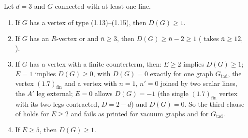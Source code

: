 
\begin{lemma}\label{sup2:lem:S7cor}
Let $d=3$ and $G$ connected with at least one line.
\begin{enumerate}[label=\textup{(\alph*)},nosep,leftmargin=*]
\item If $G$ has a vertex of type (1.13)--(1.15), then $D(G)\ge1$.
\item If $G$ has an $R$-vertex \cite[(1.9)]{Ba3} or \cite[(1.11)]{Ba3} and $\bar n\ge3$, then $D(G)\ge\bar n-2\ge1$ (\cite{Ba3} takes $\bar n\ge12$, \cite[p.~421]{Ba3}).
\item If $G$ has a vertex \cite[(1.7)]{Ba3} with a finite counterterm, then: $E\ge2$ implies $D(G)\ge1$; $E=1$ implies $D(G)\ge0$, with $D(G)=0$ exactly for one graph $G_{\mathrm{tad}}$, the vertex $(1.7)_{\mathrm{fin}}$ and a vertex \cite[(1.8)]{Ba3} with $n=1$, $n'=0$ joined by two scalar lines, the $A'$ leg external; $E=0$ allows $D(G)=-1$ (the single $(1.7)_{\mathrm{fin}}$ vertex with its two legs contracted, $D=2-d$) and $D(G)=0$. So the third clause of \cite[Cor.~2.3]{Ba3} holds for $E\ge2$ and fails as printed for vacuum graphs and for $G_{\mathrm{tad}}$.
\item If $E\ge5$, then $D(G)\ge1$.
\end{enumerate}
\end{lemma}

